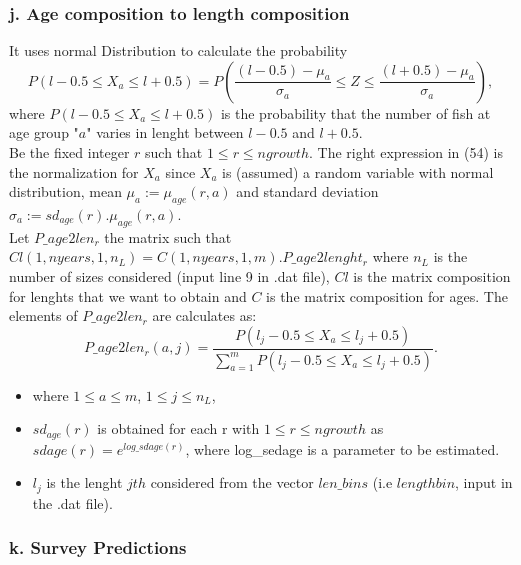 \documentclass{article}
\begin{document}
\hfill

\subsubsection{j. Age composition to length composition}

It uses normal Distribution to calculate the probability 
\begin{equation}
    P(l-0.5\leq X_a\leq l+0.5 ) = P\left(\dfrac{(l-0.5)-\mu_a}{\sigma_a}\leq Z\leq\dfrac{(l+0.5)-\mu_a}{\sigma_a}\right),
\end{equation}
where $P(l-0.5\leq X_a\leq l+0.5 )$ is the probability that the number of fish at age group "$a$" varies in lenght between  $l-0.5$ and $l+0.5$.\\Be the fixed integer $r$ such that $1\leq r \leq ngrowth$.
The right expression in (54) is the normalization for $X_a$ since $X_a$ is (assumed) a random variable with normal distribution, mean $\mu_a:=\mu_{age}(r,a)$ and  standard deviation $\sigma_{a}:=sd_{age}(r).\mu_{age}(r,a)$.\\

Let $P\_age2len_r$ the matrix such that $Cl(1,nyears,1,n_L)=C(1,nyears,1,m).P\_age2lenght_r$ where $n_L$ is the number of sizes considered (input line 9 in .dat file), $Cl$ is the matrix composition for lenghts that we want to obtain and $C$ is the matrix composition for ages. The elements of $P\_age2len_r$ are calculates as:
\begin{equation}
    P\_age2len_r(a,j) = \dfrac{P(l_j-0.5\leq X_a\leq l_j+0.5 )}{\displaystyle\sum_{a=1}^mP(l_j-0.5\leq X_a\leq l_j+0.5 )}.
\end{equation}

\begin{itemize}
    \item where $1\leq a \leq m$, $1\leq j \leq n_L$,
    \item $sd_{age}(r)$ is obtained  for each r with $1\leq r\leq ngrowth$ as $sdage(r)   = e^{log\_sdage(r)}$, where log\_sedage is a parameter to be estimated.
    \item $l_j$ is the lenght $jth$ considered from the vector $len\_bins$ (i.e $lengthbin$, input %
    in the .dat file).
\end{itemize}

\subsubsection{k. Survey Predictions}
\end{document}
